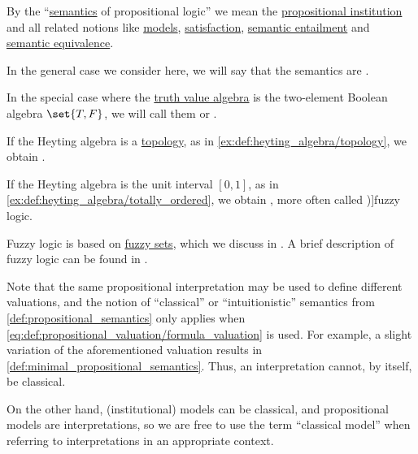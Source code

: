 \begin{definition}\label{def:propositional_semantics}\mimprovised
  By the \enquote{\hyperref[con:syntax_semantics_duality]{semantics} of propositional logic} we mean the \hyperref[def:propositional_institution]{propositional institution} and all related notions like \hyperref[def:institution/models]{models}, \hyperref[def:institution/satisfaction]{satisfaction}, \hyperref[def:institutional_entailment]{semantic entailment} and \hyperref[def:semantic_equivalence]{semantic equivalence}.

  \begin{thmenum}
     In the general case we consider here, we will say that the semantics are .

     In the special case where the \hyperref[con:truth_value_algebra]{truth value algebra} is the two-element Boolean algebra \( \set{ T, F } \), we will call them  or .

     If the Heyting algebra is a \hyperref[def:topological_space]{topology}, as in \cref{ex:def:heyting_algebra/topology}, we obtain .

     If the Heyting algebra is the unit interval \( [0, 1] \), as in \cref{ex:def:heyting_algebra/totally_ordered}, we obtain , more often called \term[en=fuzzy logic (\cite[17]{Rosen2019DiscreteMathematics})]{fuzzy logic}.
  \end{thmenum}
\end{definition}
\begin{comments}
  \item Fuzzy logic is based on \hyperref[def:fuzzy_set]{fuzzy sets}, which we discuss in . A brief description of fuzzy logic can be found in \cite[17]{Rosen2019DiscreteMathematics}.
\end{comments}

\begin{remark}\label{rem:classical_propositional_interpretations}
  Note that the same propositional interpretation may be used to define different valuations, and the notion of \enquote{classical} or \enquote{intuitionistic} semantics from \cref{def:propositional_semantics} only applies when \eqref{eq:def:propositional_valuation/formula_valuation} is used. For example, a slight variation of the aforementioned valuation results in \cref{def:minimal_propositional_semantics}. Thus, an interpretation cannot, by itself, be classical.

  On the other hand, (institutional) models can be classical, and propositional models are interpretations, so we are free to use the term \enquote{classical model} when referring to interpretations in an appropriate context.
\end{remark}

